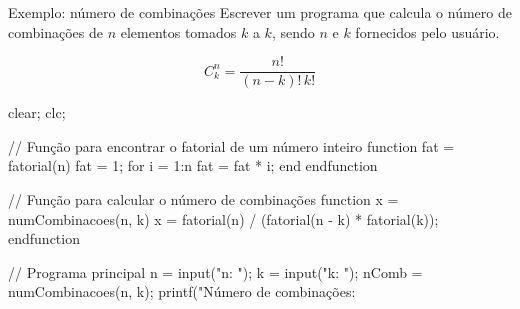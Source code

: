 
\begin{frame}{Exemplo: número de combinações}
  Escrever um programa que calcula o número de combinações de $n$
  elementos tomados $k$ a $k$, sendo $n$ e $k$ fornecidos pelo usuário.

  \[
  C^n_k = \frac{n!}{(n-k)! \, k!}
  \]

  \framebreak
  \begin{pygmented}[lang=scilab]
clear; clc;

// Função para encontrar o fatorial de um número inteiro
function fat = fatorial(n)
    fat = 1;
    for i = 1:n
        fat = fat * i;
   end
endfunction

// Função para calcular o número de combinações
function x = numCombinacoes(n, k)
    x = fatorial(n) / (fatorial(n - k) * fatorial(k));
endfunction

// Programa principal
n = input("n: ");
k = input("k: ");
nComb = numCombinacoes(n, k);
printf("Número de combinações: %
  \end{pygmented}
\end{frame}


